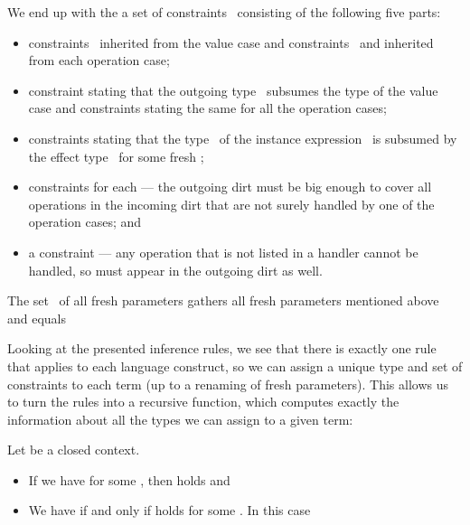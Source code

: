 \documentclass{LMCS}
\begin{document}
We end up with the a set of constraints~ consisting of the following five parts:
\begin{itemize}
\label{pag:hand-rules}
\item
  constraints~ inherited from the value case and
  constraints~ and  inherited from each operation case;
\item
  constraint  stating that the outgoing type~ subsumes the type of the value case
  and constraints  stating the same for all the operation cases;
\item
  constraints  stating that the type~ of the instance expression~ is subsumed by the effect type~ for some fresh ;
\item
  constraints  for each  ---
  the outgoing dirt must be big enough to cover all operations in the incoming dirt
  that are not surely handled by one of the operation cases; and
\item
  a constraint  --- any operation that is not listed in a handler cannot be handled,
  so must appear in the outgoing dirt as well.
\end{itemize}
The set~ of all fresh parameters gathers all fresh parameters mentioned above and equals


Looking at the presented inference rules,
we see that there is exactly one rule that applies to each language construct,
so we can assign a unique type and set of constraints to each term (up to a renaming of fresh parameters).
This allows us to turn the rules into a recursive function,
which computes exactly the information about all the types we can assign to a given term:

\begin{thm}
\label{thm:completeness}
Let  be a closed context.
\begin{itemize}
\item
  If we have  for some ,
  then  holds and
  
\item
  We have 
  if and only if  holds for some .
  In this case
  
\end{itemize}
\end{thm}
\end{document}
